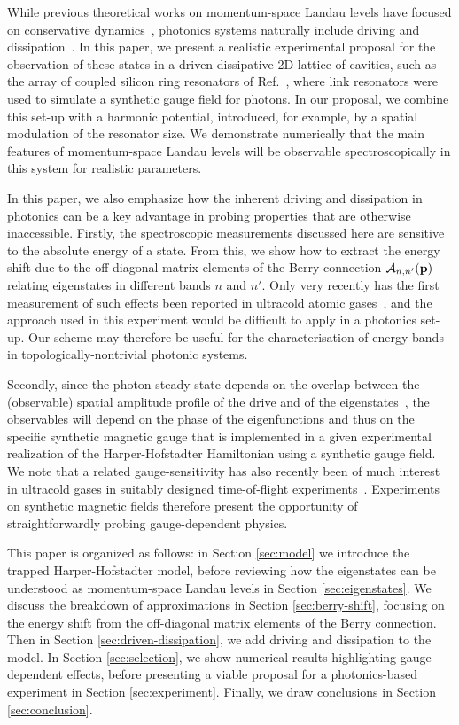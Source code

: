 \documentclass[twocolumn, 10pt, aps, superscriptaddress, floatfix, showpacs, pra, citeautoscript]{revtex4-1}
\begin{document}
While previous theoretical works on momentum-space Landau levels have focused on conservative dynamics~\cite{price2014magnetic, Claassen_prl_2015}, photonics systems naturally include driving and dissipation~\cite{carusotto2013fluids}. In this paper, we present a realistic experimental proposal for the observation of these states in a driven-dissipative 2D lattice of cavities, such as the array of coupled silicon ring resonators of Ref.~\cite{hafezi2013imaging}, where link resonators were used to simulate a synthetic gauge field for photons. In our proposal, we combine this set-up with a harmonic potential, introduced, for example, by a spatial modulation of the resonator size. We demonstrate numerically that the main features of momentum-space Landau levels will be observable spectroscopically in this system for realistic parameters. 

In this paper, we also emphasize how the inherent driving and dissipation in photonics can be a key advantage in probing properties that are otherwise inaccessible. 
Firstly, the spectroscopic measurements discussed here are sensitive to the absolute energy of a state. From this, we show how to extract the energy shift due to the off-diagonal matrix elements of the Berry connection $\mathcal{A}_{n,n'}({\bf p})$ relating eigenstates in different bands $n$ and $n'$. Only very recently has the first measurement of such effects been reported in ultracold atomic gases~\cite{Grusdt2014nonabelian,tracy2015arxiv}, and the approach used in this experiment would be difficult to apply in a photonics set-up. Our scheme may therefore be useful for the characterisation of energy bands in topologically-nontrivial photonic systems.

Secondly, since the photon steady-state depends on the overlap between the (observable) spatial amplitude profile of the drive and of the eigenstates~\cite{carusotto2013fluids}, the observables will depend on the phase of the eigenfunctions and thus on the specific synthetic magnetic gauge that is implemented in a given experimental realization of the Harper-Hofstadter Hamiltonian using a synthetic gauge field. We note that a related gauge-sensitivity has also recently been of much interest in ultracold gases in suitably designed time-of-flight experiments~\cite{kennedy2015bec,spielman2011gauge, spielman_gauge, tomoki2015nv}. Experiments on synthetic magnetic fields therefore present the opportunity of straightforwardly probing gauge-dependent physics. 

This paper is organized as follows: in Section \ref{sec:model} we introduce the trapped Harper-Hofstadter model, before reviewing how the eigenstates can be understood as momentum-space Landau levels in Section \ref{sec:eigenstates}. We discuss the breakdown of approximations in Section \ref{sec:berry-shift}, focusing on the energy shift from the off-diagonal matrix elements of the Berry connection. Then in Section \ref{sec:driven-dissipation}, we add driving and dissipation to the model. In Section \ref{sec:selection}, we show numerical results highlighting gauge-dependent effects, before presenting a viable proposal for a
photonics-based experiment in Section \ref{sec:experiment}. Finally, we draw conclusions in Section \ref{sec:conclusion}. 
\end{document}
